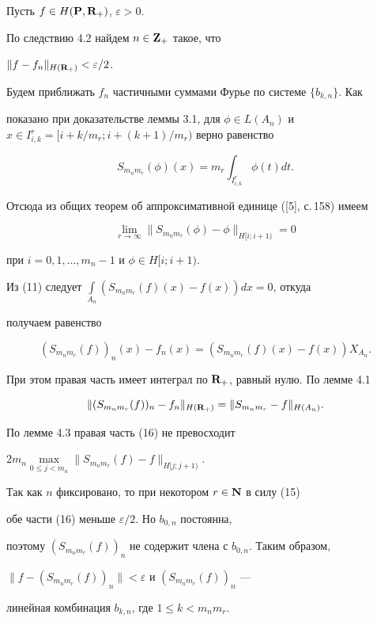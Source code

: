 \begin{pf}


Пусть $f\in H({\bold P},{\bold R}_+)$, $\varepsilon>0$. 


По следствию 4.2 найдем $n\in\bold Z_+$ такое, что


$\|f-f_n\|_{H({\bold R}_+)}<\varepsilon/2$. 


Будем приближать $f_n$ частичными суммами Фурье по системе $\{b_{k,n}\}$. Как 


показано при доказательстве леммы 3.1, для $\phi\in L(A_n)$ и $x\in I^r_{i,k}=


[i+k/m_r;i+(k+1)/m_r)$ верно равенство


$$


S_{m_nm_r}(\phi)(x)=m_r\int_{I^r_{i,k}}\phi(t)dt.


$$


Отсюда из общих теорем об аппроксимативной единице ([5], с.\,158) имеем


\begin{equation}


\lim_{r\to\infty}\|S_{m_nm_r}(\phi)-\phi\|_{H[i;i+1)}=0


\end{equation}


при $i=0,1,\dotsc,m_n-1$ и $\phi\in H[i;i+1)$. 


Из (11) следует $\int\limits_{A_n}(S_{m_nm_r}(f)(x)-f(x))dx=0$, откуда 


получаем равенство


$$


(S_{m_nm_r}(f))_n(x)-f_n(x)=(S_{m_nm_r}(f)(x)-f(x))X_{A_n}.


$$


При этом правая часть имеет интеграл по $\bold R_+$, равный нулю. По лемме 4.1


\begin{equation}


\|(S_{m_nm_r}(f))_n-f_n\|_{H({\bold R}_+)}=\|S_{m_nm_r}-f\|_{H(A_n)}.


\end{equation}


По лемме 4.3 правая часть (16) не превосходит


$2m_n\max\limits_{0\leq j<m_n}\|S_{m_nm_r}(f)-f\|_{H[j;j+1)}$. 


Так как $n$ фиксировано, то при некотором $r\in\bold N$ в силу (15) 


обе части (16) меньше $\varepsilon/2$. Но $b_{0,n}$ постоянна, 


поэтому $(S_{m_nm_r}(f))_n$ не содержит члена с $b_{0,n}$. Таким образом,


$\|f-(S_{m_nm_r}(f))_n\|<\varepsilon$ и $(S_{m_nm_r}(f))_n$ ---


линейная комбинация $b_{k,n}$, где $1\leq k<m_nm_r$.


\end{pf}








